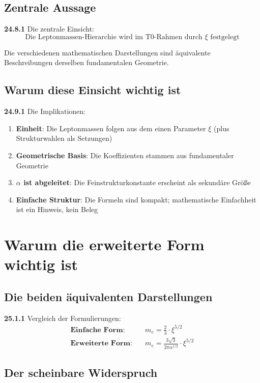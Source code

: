 \subsection{Zentrale Aussage}

\noindent \textbf{24.8.1} Die zentrale Einsicht:
\[
\boxed{
	\text{Die Leptonmassen-Hierarchie wird im T0-Rahmen durch } \xi \text{ festgelegt}
}
\]

Die verschiedenen mathematischen Darstellungen sind äquivalente Beschreibungen derselben fundamentalen Geometrie.

\subsection{Warum diese Einsicht wichtig ist}

\noindent \textbf{24.9.1} Die Implikationen:
\begin{enumerate}
	\item \textbf{Einheit}: Die Leptonmassen folgen aus dem einen Parameter $\xi$ (plus Strukturwahlen als Setzungen)
	\item \textbf{Geometrische Basis}: Die Koeffizienten stammen aus fundamentaler Geometrie
	\item \textbf{$\alpha$ ist abgeleitet}: Die Feinstrukturkonstante erscheint als sekundäre Größe
	\item \textbf{Einfache Struktur}: Die Formeln sind kompakt; mathematische Einfachheit ist ein Hinweis, kein Beleg
\end{enumerate}

\section{Warum die erweiterte Form wichtig ist}

\subsection{Die beiden äquivalenten Darstellungen}

\noindent \textbf{25.1.1} Vergleich der Formulierungen:
\begin{align*}
	\textbf{Einfache Form:} &\quad m_e = \frac{2}{3} \cdot \xi^{5/2} \\
	\textbf{Erweiterte Form:} &\quad m_e = \frac{3\sqrt{3}}{2\pi\alpha^{1/2}} \cdot \xi^{5/2}
\end{align*}

\subsection{Der scheinbare Widerspruch}

